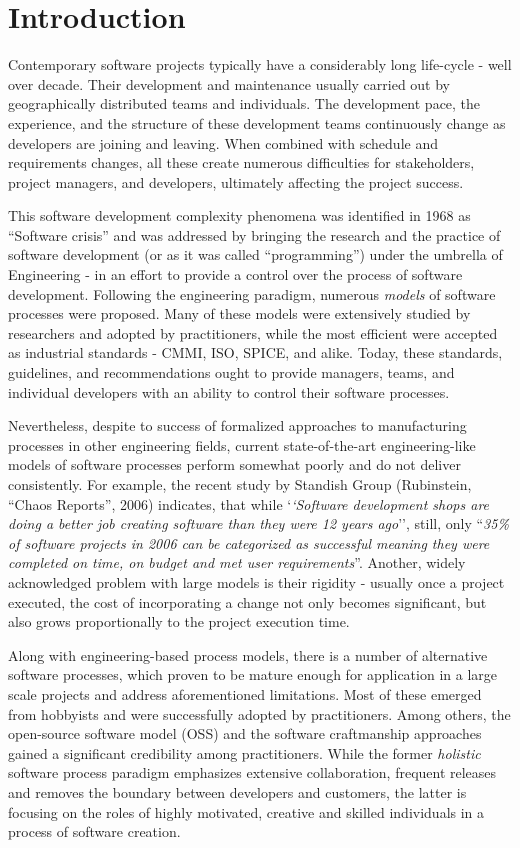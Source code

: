 \chapter{Introduction}
Contemporary software projects typically have a considerably long life-cycle - well over decade.
Their development and maintenance usually carried out by geographically distributed teams 
and individuals. The development pace, the experience, and the structure of these development 
teams continuously change as developers are joining and leaving. When combined with
schedule and requirements changes, all these create numerous difficulties for stakeholders,
project managers, and developers, ultimately affecting the project success. 

This software development complexity phenomena was identified in 1968 as ``Software crisis'' 
and was addressed by bringing the research and the practice of software development 
(or as it was called ``programming'') under the umbrella of Engineering - in an effort to provide a 
control over the process of software development. 
Following the engineering paradigm, numerous \textit{models} of software processes were proposed.
Many of these models were extensively studied by researchers and adopted by practitioners, 
while the most efficient were accepted as industrial standards - CMMI, ISO, SPICE, and alike.
Today, these standards, guidelines, and recommendations ought to provide managers, teams, 
and individual developers with an ability to control their software processes.

Nevertheless, despite to success of formalized approaches to manufacturing processes in other 
engineering fields, current state-of-the-art engineering-like models of software processes perform 
somewhat poorly and do not deliver consistently. 
For example, the recent study by Standish Group (Rubinstein, ``Chaos Reports'', 2006) indicates,
that while `\textit{`Software development shops are doing a better job creating software than they were 
12 years ago}'', still, only ``\textit{35\% of software projects in 2006 can be categorized 
as successful meaning they were completed on time, on budget and met user requirements}”.
Another, widely acknowledged problem with large models is their rigidity - usually once a project executed, 
the cost of incorporating a change not only becomes significant, but also grows proportionally to 
the project execution time.

Along with engineering-based process models, there is a number of alternative software processes,
which proven to be mature enough for application in a large scale projects and address aforementioned 
limitations. Most of these emerged from hobbyists and were successfully adopted by practitioners.
Among others, the open-source software model (OSS) and the software craftmanship approaches gained a 
significant credibility among practitioners.
While the former \textit{holistic} software process paradigm emphasizes extensive collaboration, frequent releases 
and removes the boundary between developers and customers, the latter is focusing on the roles 
of highly motivated, creative and skilled individuals in a process of software creation. 

